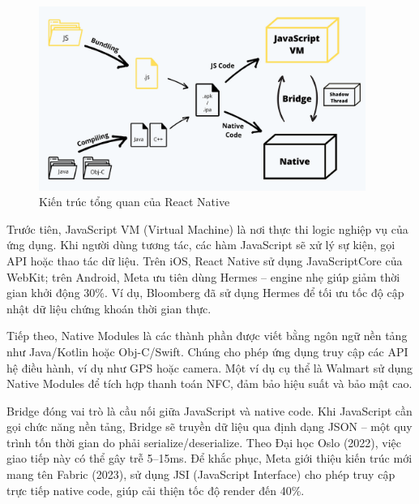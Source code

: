 \begin{figure}[H]
    \centering
    \includegraphics[width=0.95\textwidth]{images/react_native.png}
    \caption{Kiến trúc tổng quan của React Native~\cite{react-native-fabric}}
\end{figure}

\begin{sloppypar}
Trước tiên, JavaScript VM (Virtual Machine) là nơi thực thi logic nghiệp vụ của ứng dụng.  
Khi người dùng tương tác, các hàm JavaScript sẽ xử lý sự kiện, gọi API hoặc thao tác dữ liệu.  
Trên iOS, React Native sử dụng JavaScriptCore của WebKit; trên Android, Meta ưu tiên dùng Hermes – engine nhẹ giúp giảm thời gian khởi động 30\%.  
Ví dụ, Bloomberg đã sử dụng Hermes để tối ưu tốc độ cập nhật dữ liệu chứng khoán thời gian thực.
\end{sloppypar}

\begin{sloppypar}
Tiếp theo, Native Modules là các thành phần được viết bằng ngôn ngữ nền tảng như Java/Kotlin hoặc Obj-C/Swift.  
Chúng cho phép ứng dụng truy cập các API hệ điều hành, ví dụ như GPS hoặc camera.  
Một ví dụ cụ thể là Walmart sử dụng Native Modules để tích hợp thanh toán NFC, đảm bảo hiệu suất và bảo mật cao.
\end{sloppypar}

\begin{sloppypar}
Bridge đóng vai trò là cầu nối giữa JavaScript và native code.  
Khi JavaScript cần gọi chức năng nền tảng, Bridge sẽ truyền dữ liệu qua định dạng JSON – một quy trình tốn thời gian do phải serialize/\-deserialize.  
Theo Đại học Oslo (2022), việc giao tiếp này có thể gây trễ 5–15ms.  
Để khắc phục, Meta giới thiệu kiến trúc mới mang tên Fabric (2023), sử dụng JSI (JavaScript\- Interface) cho phép truy cập trực tiếp native code, giúp cải thiện tốc độ render đến 40\%.
\end{sloppypar}

